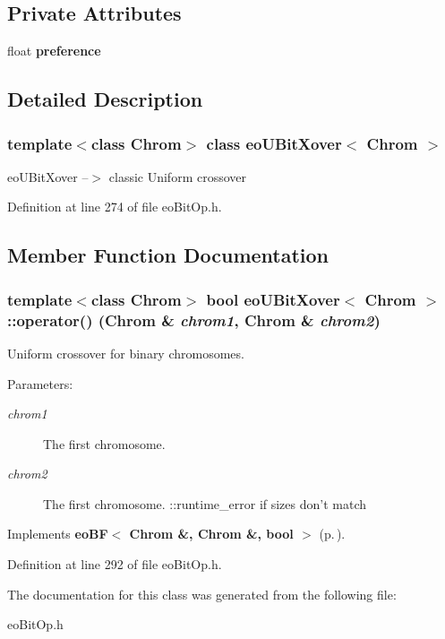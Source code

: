 \subsection*{Private Attributes}
\begin{CompactItemize}
\item 
float {\bf preference}\label{classeo_u_bit_xover_r0}

\end{CompactItemize}


\subsection{Detailed Description}
\subsubsection*{template$<$class Chrom$>$ class eo\-UBit\-Xover$<$ Chrom $>$}

eo\-UBit\-Xover --$>$ classic Uniform crossover 



Definition at line 274 of file eo\-Bit\-Op.h.

\subsection{Member Function Documentation}
\subsubsection{\setlength{\rightskip}{0pt plus 5cm}template$<$class Chrom$>$ bool {\bf eo\-UBit\-Xover}$<$ Chrom $>$::operator() (Chrom \& {\em chrom1}, Chrom \& {\em chrom2})\hspace{0.3cm}{\tt  [inline, virtual]}}\label{classeo_u_bit_xover_a2}


Uniform crossover for binary chromosomes. 

\begin{Desc}
\item[Parameters:]
\begin{description}
\item[{\em chrom1}]The first chromosome. \item[{\em chrom2}]The first chromosome. ::runtime\_\-error if sizes don't match \end{description}
\end{Desc}


Implements {\bf eo\-BF$<$ Chrom \&, Chrom \&, bool $>$} {\rm (p.\,\pageref{classeo_b_f_a1})}.

Definition at line 292 of file eo\-Bit\-Op.h.

The documentation for this class was generated from the following file:\begin{CompactItemize}
\item 
eo\-Bit\-Op.h\end{CompactItemize}
